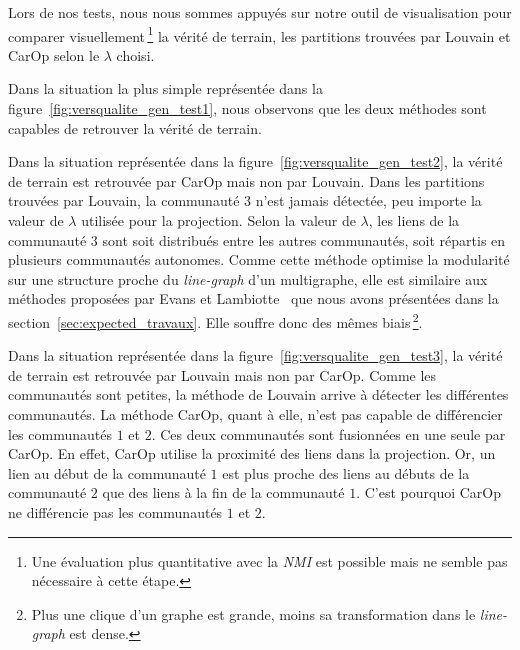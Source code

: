 Lors de nos tests, nous nous sommes appuyés sur notre outil de visualisation pour comparer visuellement\,\footnote{Une évaluation plus quantitative avec la \emph{NMI} est possible mais ne semble pas nécessaire à cette étape.} la vérité de terrain, les partitions trouvées par Louvain et CarOp selon le $\lambda$ choisi.

\bigskip

Dans la situation la plus simple représentée dans la figure~\ref{fig:versqualite_gen_test1}, nous observons que les deux méthodes sont capables de retrouver la vérité de terrain.

Dans la situation représentée dans la figure~\ref{fig:versqualite_gen_test2}, la vérité de terrain est retrouvée par CarOp mais non par Louvain.
Dans les partitions trouvées par Louvain, la communauté $3$ n'est jamais détectée, peu importe la valeur de $\lambda$ utilisée pour la projection.
Selon la valeur de $\lambda$, les liens de la communauté $3$ sont soit distribués entre les autres communautés, soit répartis en plusieurs communautés autonomes.
Comme cette méthode optimise la modularité sur une structure proche du \emph{line-graph} d'un multigraphe, elle est similaire aux méthodes proposées par Evans et Lambiotte~\cite{Evans2009} que nous avons présentées dans la section~\ref{sec:expected_travaux}.
Elle souffre donc des mêmes biais\,\footnote{Plus une clique d'un graphe est grande, moins sa transformation dans le \emph{line-graph} est dense.}.

Dans la situation représentée dans la figure~\ref{fig:versqualite_gen_test3}, la vérité de terrain est retrouvée par Louvain mais non par CarOp.
Comme les communautés sont petites, la méthode de Louvain arrive à détecter les différentes communautés.
La méthode CarOp, quant à elle, n'est pas capable de différencier les communautés $1$ et $2$.
Ces deux communautés sont fusionnées en une seule par CarOp.
En effet, CarOp utilise la proximité des liens dans la projection.
Or, un lien au début de la communauté $1$ est plus proche des liens au débuts de la communauté $2$ que des liens à la fin de la communauté $1$.
C'est pourquoi CarOp ne différencie pas les communautés $1$ et $2$.




